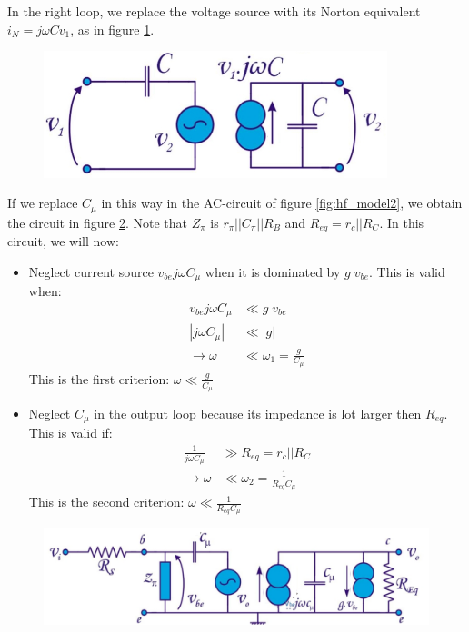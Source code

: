 In the right loop, we replace the voltage source with its Norton equivalent $i_N = j \omega C v_1$, as in figure \ref{fig:milcap4}.

\begin{figure}[h!]
	\centering
	\includegraphics[width=10cm]{figures/ch03/milcap4.jpg}
	\caption{}
	\label{fig:milcap4}
\end{figure}

If we replace $C_{\mu}$ in this way in the AC-circuit of figure \ref{fig:hf_model2}, we obtain the circuit in figure \ref{fig:milcap5}. Note that $Z_\pi$ is $r_\pi || C_\pi || R_B$ and $R_{eq} = r_c || R_C$. In this circuit, we will now:
\begin{itemize}
	\item Neglect current source $v_{be} j \omega C_{\mu}$ when it is dominated by $ g\;  v_{be}$. This is valid when:
	\begin{align*}
		v_{be} j \omega C_{\mu} &\ll g\;  v_{be}\\
		| j \omega C_{\mu}| &\ll |g| \\
		\rightarrow \omega &\ll \omega_1 = \frac{g}{C_{\mu}}
	\end{align*}
	This is the first criterion: $\omega \ll  \frac{g}{C_{\mu}}$
	\item Neglect $C_{\mu}$ in the output loop because its impedance is lot larger then $R_{eq}$. This is valid if:
	\begin{align*}
		\frac{1}{j \omega C_{\mu}} &\gg R_{eq} = r_c || R_C\\
		\rightarrow \omega &\ll \omega_2 = \frac{1}{R_{eq}C_{\mu}}
	\end{align*}
	This is the second criterion: $\omega \ll  \frac{1}{R_{eq}C_{\mu}} $
\end{itemize}
\begin{figure}[h!]
	\centering
	\includegraphics[width=12cm]{figures/ch03/milcap5.jpg}
	\caption{}
	\label{fig:milcap5}
\end{figure}
